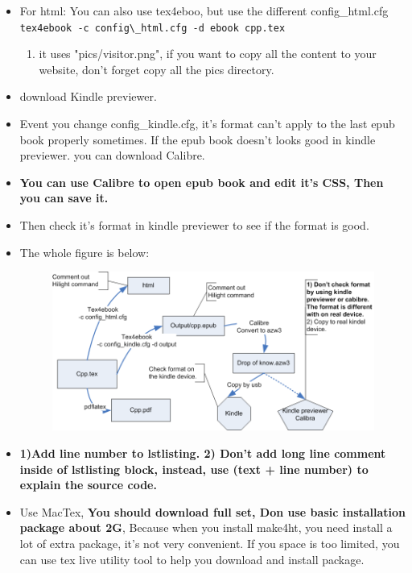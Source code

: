 \documentclass[a4paper,12pt,twoside]{book}
\begin{document}
\begin{itemize}
\item For html: You can also use tex4eboo, but use the different config\_html.cfg \\
\verb|tex4ebook -c config\_html.cfg -d ebook cpp.tex|
\begin{enumerate}
	\item it uses "pics/visitor.png", if you want to copy all the content to your website, don't forget copy all the pics directory.
\end{enumerate}

\item download Kindle previewer.

\item Event you change config\_kindle.cfg, it's format can't apply to the last epub book properly sometimes.  If the epub book doesn't looks good in kindle previewer. you can download Calibre. 

\item \textbf{You can use Calibre to open epub book and edit it's CSS, Then you can save it.}

\item Then check it's format in kindle previewer to see if the format is good. 

\item The whole figure is below:
\begin{figure}
	\centering
	\includegraphics[width=0.7\linewidth]{pics/ebook.png}
	\caption{}
	\label{fig:ebook}
\end{figure}

\item \textbf{ 1)Add line number to lstlisting. 2) Don't add long line comment inside of lstlisting block, instead, use (text + line number) to explain the source code.}



\item Use MacTex, \textbf{You should download full set, Don use basic installation package about 2G}, Because when you install make4ht, you need install a lot of extra package, it's not very convenient. If you space is too limited, you can use tex live utility tool to help you download and install package. 


\end{itemize}
\end{document}
